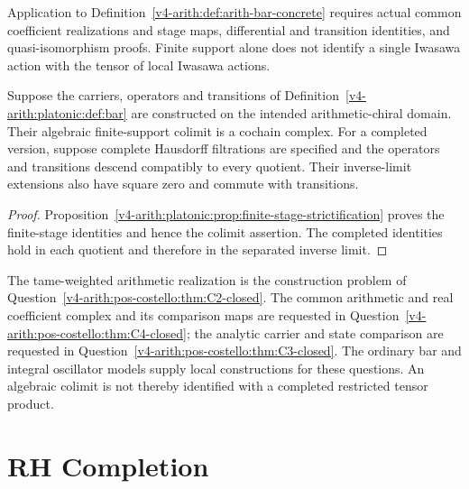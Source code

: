 Application to Definition~\ref{v4-arith:def:arith-bar-concrete} requires
actual common coefficient realizations and stage maps, differential and
transition identities, and quasi-isomorphism proofs. Finite support
alone does not identify a single Iwasawa action with the tensor of
local Iwasawa actions.

\begin{theorem}
\label{v4-arith:platonic:thm:bar-closure}
Suppose the carriers, operators and transitions of
Definition~\ref{v4-arith:platonic:def:bar} are constructed on the intended
arithmetic-chiral domain. Their algebraic finite-support colimit is a
cochain complex. For a completed version, suppose complete Hausdorff
filtrations are specified and the operators and transitions descend
compatibly to every quotient. Their inverse-limit extensions also have
square zero and commute with transitions.
\end{theorem}
\begin{proof}
Proposition~\ref{v4-arith:platonic:prop:finite-stage-strictification}
proves the finite-stage identities and hence the colimit assertion.
The completed identities hold in each quotient and therefore in the
separated inverse limit.
\end{proof}

The tame-weighted arithmetic realization is the construction problem of
Question~\ref{v4-arith:pos-costello:thm:C2-closed}. The common arithmetic
and real coefficient complex and its comparison maps are requested in
Question~\ref{v4-arith:pos-costello:thm:C4-closed}; the analytic carrier
and state comparison are requested in
Question~\ref{v4-arith:pos-costello:thm:C3-closed}. The ordinary bar and
integral oscillator models supply local constructions for these
questions. An algebraic colimit is not thereby identified with a
completed restricted tensor product.

\section{RH Completion}
\label{v4-arith:platonic:RH-completion}

